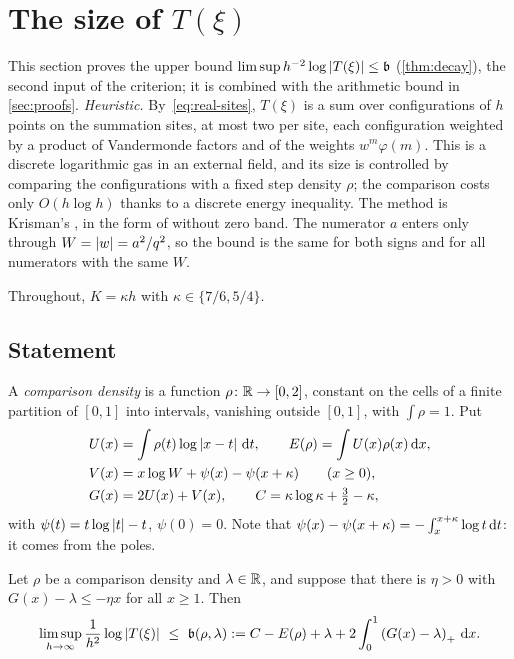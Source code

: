 \section{The size of \texorpdfstring{$T(\xi)$}{T(ξ)}}\label{sec:decay}

This section proves the upper bound $\limsup h^{-2}\log\left\lvert T(\xi)\right\rvert\le\mathfrak{b}$
(\cref{thm:decay}), the second input of the criterion; it is combined with the arithmetic bound in
\cref{sec:proofs}. \emph{Heuristic.} By~\eqref{eq:real-sites}, $T(\xi)$ is a sum over
configurations of $h$ points on the summation sites, at most two per site, each configuration
weighted by a product of Vandermonde factors and of the weights $w^m\varphi(m)$. This is a discrete
logarithmic gas in an external field, and its size is controlled by comparing the configurations
with a fixed step density $\rho$; the comparison costs only $O(h\log h)$ thanks to a discrete
energy inequality. The method is Krisman's \cite[\S6--7]{Krisman2026chi2}, in the form of
\cite{AxiomForge2026numeratorTwo} without zero band. The numerator $a$ enters only through
$W=\left\lvert w\right\rvert=a^2/q^2$, so the bound is the same for both signs and for all numerators with the same
$W$.

Throughout, $K=\kappa h$ with $\kappa\in\{7/6,5/4\}$.

\subsection{Statement}\label{subsec:decay-statement}

A \emph{comparison density} is a function $\rho\colon\mathbb{R}\to[0,2]$, constant on the cells of a
finite partition of $[0,1]$ into intervals, vanishing outside $[0,1]$, with $\int\rho=1$. Put
\begin{align*}
  U(x)&=\int\rho(t)\log\left\lvert x-t\right\rvert\,\mathrm{d} t,\qquad E(\rho)=\int U(x)\rho(x)\,\mathrm{d} x,\\
  V(x)&=x\log W+\psi(x)-\psi(x+\kappa)\qquad(x\ge0),\\
  G(x)&=2U(x)+V(x),\qquad C=\kappa\log\kappa+\tfrac32-\kappa,
\end{align*}
with $\psi(t)=t\log\left\lvert t\right\rvert-t$, $\psi(0)=0$. Note that $\psi(x)-\psi(x+\kappa)=-\int_x^{x+\kappa}\log
t\,\mathrm{d} t$: it comes from the poles.

\begin{theorem}\label{thm:decay}
Let $\rho$ be a comparison density and $\lambda\in\mathbb{R}$, and suppose that there is $\eta>0$ with
$G(x)-\lambda\le-\eta x$ for all $x\ge1$. Then
\[
  \limsup_{h\to\infty}\frac{1}{h^2}\log\abs{T(\xi)}\ \le\ \bconst(\rho,\lambda):=
  C-E(\rho)+\lambda+2\int_0^1\pos{G(x)-\lambda}\diff x .
\]
\end{theorem}

